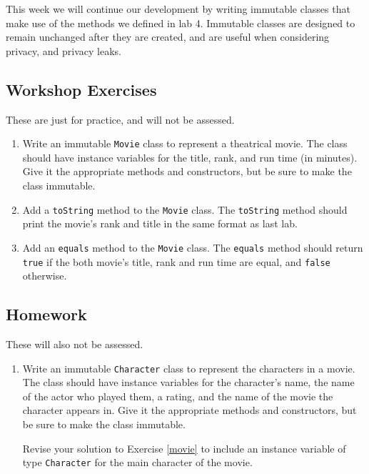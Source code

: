\documentclass[a4paper]{article}
\begin{document}
This week we will continue our development by writing immutable classes that make use of the methods we defined in lab 4. Immutable classes are designed to remain unchanged after they are created, and are useful when considering privacy, and privacy leaks.

\subsection*{Workshop Exercises}
These are just for practice, and will not be assessed.
\begin{enumerate}
\item Write an immutable \texttt{Movie} class to represent a theatrical movie. The class should have instance variables for the title, rank, and run time (in minutes). Give it the appropriate methods and constructors, but be sure to make the class immutable.  \label{movie}

\item Add a \texttt{toString} method to the \texttt{Movie} class. The \texttt{toString} method should print the movie's rank and title in the same format as last lab.

\item Add an \texttt{equals} method to the \texttt{Movie} class. The \texttt{equals} method should return \verb|true| if the both movie's title, rank and run time are equal, and \verb|false| otherwise.
\end{enumerate}

\subsection*{Homework}
These will also not be assessed.
\begin{enumerate}[resume]
\item Write an immutable \texttt{Character} class to represent the characters in a movie. The class should have instance variables for the character's name, the name of the actor who played them, a rating, and the name of the movie the character appears in. Give it the appropriate methods and constructors, but be sure to make the class immutable.

Revise your solution to Exercise \ref{movie} to include an instance variable of type \texttt{Character} for the main character of the movie. 
\label{appointment}
\end{enumerate}
\end{document}
